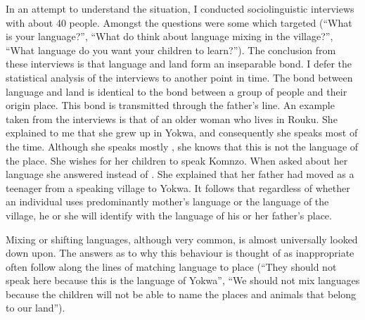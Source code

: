 In an attempt to understand the situation, I conducted sociolinguistic interviews with about 40 people. Amongst the questions were some which targeted  (``What is your language?'', ``What do think about language mixing in the village?'', ``What language do you want your children to learn?''). The conclusion from these interviews is that language and land form an inseparable bond. I defer the statistical analysis of the interviews to another point in time. The bond between language and land is identical to the bond between a group of people and their origin place. This bond is transmitted through the father's line. An example taken from the interviews is that of an older woman who lives in Rouku. She explained to me that she grew up in Yokwa, and consequently she speaks  most of the time. Although she speaks mostly , she knows that this is not the language of the place. She wishes for her children to speak Komnzo. When asked about her language she answered  instead of . She explained that her father had moved as a teenager from a  speaking village to Yokwa. It follows that regardless of whether an individual uses predominantly mother's language or the language of the village, he or she will identify with the language of his or her father's place.

Mixing or shifting languages, although very common, is almost universally looked down upon. The answers as to why this behaviour is thought of as inappropriate often follow along the lines of matching language to place (``They should not speak  here because this is the language of Yokwa'', ``We should not mix languages because the children will not be able to name the places and animals that belong to our land'').


